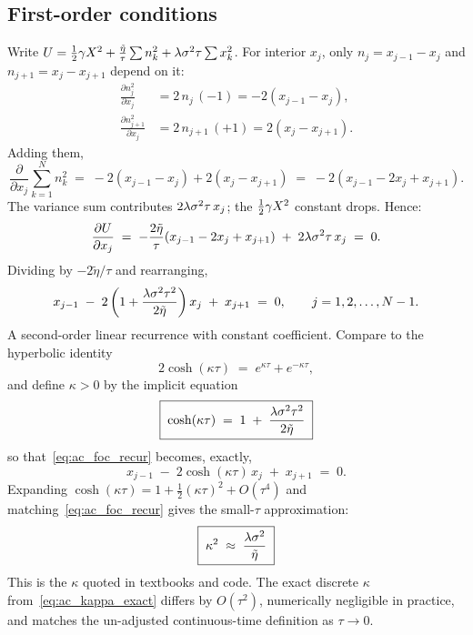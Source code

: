 \subsection{First-order conditions}
\label{subsec:ac_foc}

Write $U = \tfrac{1}{2}\gamma X^2 + \tfrac{\tilde\eta}{\tau}\sum
n_k^2 + \lambda\sigma^2\tau\sum x_k^2$. For interior $x_j$, only
$n_j = x_{j-1} - x_j$ and $n_{j+1} = x_j - x_{j+1}$ depend on it:
\begin{align*}
  \frac{\partial n_j^2}{\partial x_j}
    &= 2\,n_j\,(-1) = -2(x_{j-1} - x_j), \\
  \frac{\partial n_{j+1}^2}{\partial x_j}
    &= 2\,n_{j+1}\,(+1) = 2(x_j - x_{j+1}).
\end{align*}
Adding them,
\begin{equation*}
  \frac{\partial}{\partial x_j}\sum_{k=1}^N n_k^2
  \;=\; -2(x_{j-1} - x_j) + 2(x_j - x_{j+1})
  \;=\; -2(x_{j-1} - 2x_j + x_{j+1}).
\end{equation*}
The variance sum contributes $2\lambda\sigma^2\tau\,x_j$; the
$\tfrac{1}{2}\gamma X^2$ constant drops. Hence:
\begin{equation*}
  \frac{\partial U}{\partial x_j}
  \;=\; -\frac{2\tilde\eta}{\tau}(x_{j-1} - 2x_j + x_{j+1})
       \;+\; 2\lambda\sigma^2\tau\,x_j
  \;=\; 0.
\end{equation*}
Dividing by $-2\tilde\eta/\tau$ and rearranging,
\begin{equation}
  x_{j-1} \;-\; 2\left(1 + \frac{\lambda\sigma^2\tau^2}{2\tilde\eta}\right) x_j
          \;+\; x_{j+1} \;=\; 0,
  \qquad j = 1, 2, \ldots, N-1.
  \label{eq:ac_foc_recur}
\end{equation}
A second-order linear recurrence with constant coefficient. Compare
to the hyperbolic identity
\begin{equation*}
  2\cosh(\kappa\tau) \;=\; e^{\kappa\tau} + e^{-\kappa\tau},
\end{equation*}
and define $\kappa > 0$ by the implicit equation
\begin{equation}
  \boxed{\;
  \cosh(\kappa\tau) \;=\; 1 \;+\; \frac{\lambda\sigma^2\tau^2}{2\tilde\eta}
  \;}
  \label{eq:ac_kappa_exact}
\end{equation}
so that~\eqref{eq:ac_foc_recur} becomes, exactly,
\begin{equation}
  x_{j-1} \;-\; 2\cosh(\kappa\tau)\,x_j \;+\; x_{j+1} \;=\; 0.
  \label{eq:ac_recur_sinh}
\end{equation}
Expanding $\cosh(\kappa\tau) = 1 + \tfrac{1}{2}(\kappa\tau)^2 +
O(\tau^4)$ and matching~\eqref{eq:ac_foc_recur} gives the
small-$\tau$ approximation:
\begin{equation}
  \boxed{\;\kappa^2 \;\approx\; \frac{\lambda\sigma^2}{\tilde\eta}\;}
  \label{eq:ac_kappa_approx}
\end{equation}
This is the $\kappa$ quoted in textbooks and code. The exact
discrete $\kappa$ from~\eqref{eq:ac_kappa_exact} differs by
$O(\tau^2)$, numerically negligible in practice, and matches the
un-adjusted continuous-time definition as $\tau \to 0$.


